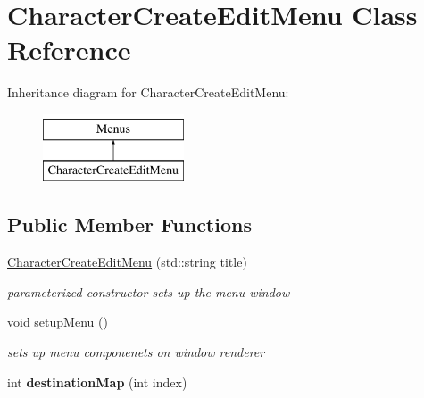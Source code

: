 \hypertarget{class_character_create_edit_menu}{}\section{Character\+Create\+Edit\+Menu Class Reference}
\label{class_character_create_edit_menu}
Inheritance diagram for Character\+Create\+Edit\+Menu\+:\begin{figure}[H]
\begin{center}
\leavevmode
\includegraphics[height=2.000000cm]{class_character_create_edit_menu}
\end{center}
\end{figure}
\subsection*{Public Member Functions}
\begin{DoxyCompactItemize}
\item 
\hypertarget{class_character_create_edit_menu_ab713a0819063c29719b3b217815941d3}{}\label{class_character_create_edit_menu_ab713a0819063c29719b3b217815941d3} 
\hyperlink{class_character_create_edit_menu_ab713a0819063c29719b3b217815941d3}{Character\+Create\+Edit\+Menu} (std\+::string title)
\begin{DoxyCompactList}\small\item\em parameterized constructor sets up the menu window \end{DoxyCompactList}\item 
\hypertarget{class_character_create_edit_menu_a29cfaa4823d1748bae47e5d68aead642}{}\label{class_character_create_edit_menu_a29cfaa4823d1748bae47e5d68aead642} 
void \hyperlink{class_character_create_edit_menu_a29cfaa4823d1748bae47e5d68aead642}{setup\+Menu} ()
\begin{DoxyCompactList}\small\item\em sets up menu componenets on window renderer \end{DoxyCompactList}\item 
\hypertarget{class_character_create_edit_menu_a5b48690c5ab301ff620bb2bfe4ab8a97}{}\label{class_character_create_edit_menu_a5b48690c5ab301ff620bb2bfe4ab8a97} 
int {\bfseries destination\+Map} (int index)
\end{DoxyCompactItemize}
